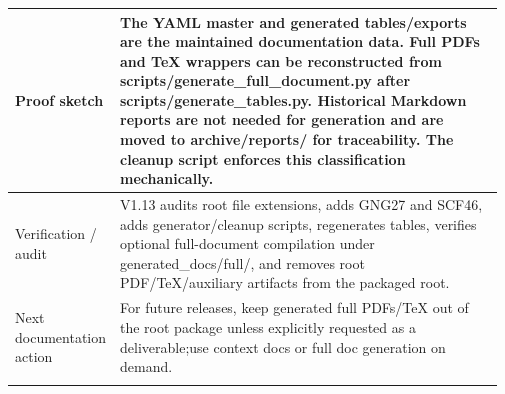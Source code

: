 \begin{longtable}{L{0.16\linewidth} L{0.81\linewidth}}
\hline\addlinespace[0.20em]
Proof sketch & The YAML master and generated tables/\allowbreak{}exports are the maintained documentation data. Full PDFs and TeX wrappers can be reconstructed from scripts/\allowbreak{}generate\_full\_document.py after scripts/\allowbreak{}generate\_tables.py. Historical Markdown reports are not needed for generation and are moved to archive/\allowbreak{}reports/\allowbreak{} for traceability. The cleanup script enforces this classification mechanically.\\
\hline\addlinespace[0.20em]
Verification /\allowbreak{} audit & V1.13 audits root file extensions, adds GNG27 and SCF46, adds generator/\allowbreak{}cleanup scripts, regenerates tables, verifies optional full-document compilation under generated\_docs/\allowbreak{}full/\allowbreak{}, and removes root PDF/\allowbreak{}TeX/\allowbreak{}auxiliary artifacts from the packaged root.\\
\hline\addlinespace[0.20em]
Next documentation action & For future releases, keep generated full PDFs/\allowbreak{}TeX out of the root package unless explicitly requested as a deliverable;\newline use context docs or full doc generation on demand.\\
\hline\addlinespace[0.20em]
\end{longtable}
